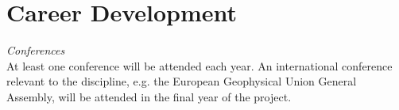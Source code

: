 \section*{Career Development}
\vspace{0.6cm}
\textit{Conferences}\\
At least one conference will be attended each year. An international conference relevant to the discipline, e.g. the European Geophysical Union General Assembly, will be attended in the final year of the project.